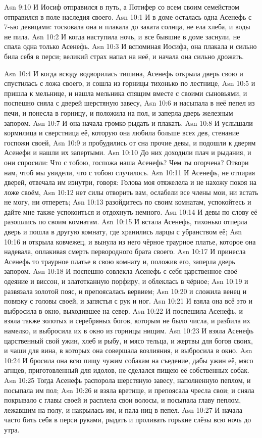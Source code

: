 \vs Asn 9:10
И Иосиф отправился в путь,
а Потифер со всем своим семейством отправился в поле наследия своего.
\vs Asn 10:1
И в доме осталась одна Асенефь с 7-ью девицами:
тосковала она и плакала до заката солнца, не ела хлеба, и воды не пила.
\vs Asn 10:2
И когда наступила ночь, и все бывшие в доме заснули,
не спала одна только Асенефь.
\vs Asn 10:3
И вспоминая Иосифа, она плакала и сильно била себя в перси;
великий страх напал на неё, и начала она сильно дрожать.

\vs Asn 10:4
И когда всюду водворилась тишина,
Асенефь открыла дверь свою и спустилась с ложа своего, и сошла из
горницы тихонько по лестнице,
\vs Asn 10:5
и пришла к мельнице, и нашла
мельника спящим вместе с своими сыновьями, и поспешно сняла с дверей шерстяную
завесу,
\vs Asn 10:6
и насыпала в неё пепел из печи,
и понесла в горницу, и положила на пол,
и заперла дверь железным запором.
\vs Asn 10:7
И она начала громко рыдать и плакать.
\vs Asn 10:8
И услышали кормилица и сверстница её,
которую она любила больше всех дев, стенание госпожи своей,
\vs Asn 10:9
и пробудились от сна прочие девы,
и подошли к дверям Асенефи и нашли их запертыми.
\vs Asn 10:10
До них доходили плач и рыдания,
и они спросили: Что с тобою, госпожа наша Асенефь?
Чем ты огорчена?
 Отвори нам, чтоб мы увидели, что с тобою случилось.
\vs Asn 10:11
И Асенефь, не отпирая дверей, отвечала им изнутри, говоря:
Голова моя отяжелела и не нахожу покоя на ложе своём,
\vs Asn 10:12
нет силы отворить вам,
ослабели все члены мои, ни встать не могу, ни отпереть;
\vs Asn 10:13
разойдитесь по своим комнатам,
успокойтесь и дайте мне также успокоиться
и отдохнуть немного.
\vs Asn 10:14
И девы по слову её разошлись по своим комнатам.
\vs Asn 10:15
И встала Асенефь, тихонько отперла дверь
и пошла в другую комнату, где хранились ларцы с убранством её;
\vs Asn 10:16
и открыла ковчежец, и вынула из него
чёрное траурное платье,
которое она надевала,
оплакивая смерть первородного брата своего.
\vs Asn 10:17
И принесла Асенефь то траурное платье
в свою комнату и, положив его, заперла дверь запором.
\vs Asn 10:18
И поспешно совлекла Асенефь с себя
царственное своё одеяние и виссон,
и златотканную порфиру, и облеклась в чёрное;
\vs Asn 10:19
и развязала золотой пояс, и препоясалась вервием;
\vs Asn 10:20
и сложила венец и повязку с головы своей,
и запястья с рук и ног.
\vs Asn 10:21
И взяла она всё это и выбросила в окно,
выходившее на север.
\vs Asn 10:22
И поспешила Асенефь,
и взяла также золотых и серебряных богов,
которым не было числа, и разбила их намелко,
и выбросила их в окно из горницы нищим.
\vs Asn 10:23
И взяла Асенефь царственный свой ужин,
хлеб и рыбу, и мясо тельца,
и жертвы для богов своих, и чаши для вина,
в которых она совершала возлияния, и выбросила в окно.
\vs Asn 10:24
И бросила она всю пищу чужим собакам на съедение,
дабы ужин её, мясо агнцев, приготовленный для
идолов, не сделался пищею её собственных собак.
\vs Asn 10:25
Тогда Асенефь распорола шерстяную завесу,
наполненную пеплом, и посыпала им пол;
\vs Asn 10:26
и взяла вретище, и препоясала чресла свои;
и сняла покрывало с главы своей и расплела свои волосы,
и посыпала главу пеплом,
лежавшим на полу, и накрылась им, и пала ниц в пепел.
\vs Asn 10:27
И начала часто бить себя в перси руками,
рыдать и проливать горькие слёзы всю ночь до утра.

